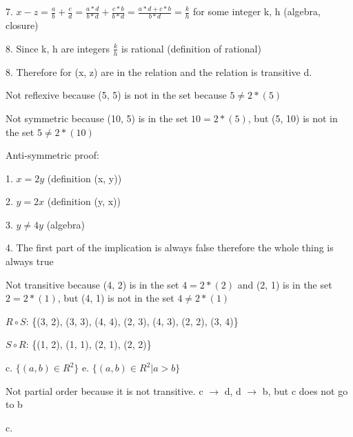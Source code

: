 \documentclass[12pt]{article}
\newenvironment{problem}[2][Problem]{\begin{trivlist}
\item[\hskip \labelsep {\bfseries #1}\hskip \labelsep {\bfseries #2.}]}{\end{trivlist}}
\begin{document}
7. $x - z = \frac{a}{b} + \frac{c}{d} = \frac{a*d}{b*d} + \frac{c*b}{b*d} = \frac{a*d+c*b}{b*d} = \frac{k}{h}$ for some integer k, h (algebra, closure)

8. Since k, h are integers $\frac{k}{h}$ is rational (definition of rational)

8. Therefore for (x, z) are in the relation and the relation is transitive
\newline
d.

Not reflexive because (5, 5) is not in the set because $5 \neq 2*(5)$

Not symmetric because (10, 5) is in the set $10 = 2*(5)$, but (5, 10) is not in the set $5 \neq 2*(10)$

Anti-symmetric proof:

1. $x = 2y$ (definition (x, y))

2. $y = 2x$ (definition (y, x))

3. $y \neq 4y$ (algebra)

4. The first part of the implication is always false therefore the whole thing is always true

Not transitive because (4, 2) is in the set $4 = 2*(2)$ and (2, 1) is in the set $2 = 2*(1)$, but (4, 1) is not in the set $4 \neq 2*(1)$

\begin{problem}{9.1.32}
\end{problem}

$R \circ S$: \{(3, 2), (3, 3), (4, 4), (2, 3), (4, 3), (2, 2), (3, 4)\}

$S \circ R$: \{(1, 2), (1, 1), (2, 1), (2, 2)\}

\begin{problem}{9.1.36}
\end{problem}
c. $\{ (a, b) \in R^2\}$
\newline
e. $\{ (a, b) \in R^2 | a > b\}$

\begin{problem}{9.6.10}
\end{problem}

Not partial order because it is not transitive. c $\rightarrow$ d, d $\rightarrow$ b, but c does not go to b

\begin{problem}{9.6.22}
\end{problem}

c.


\begin{problem}{9.6.26}
\end{problem}
\end{document}

